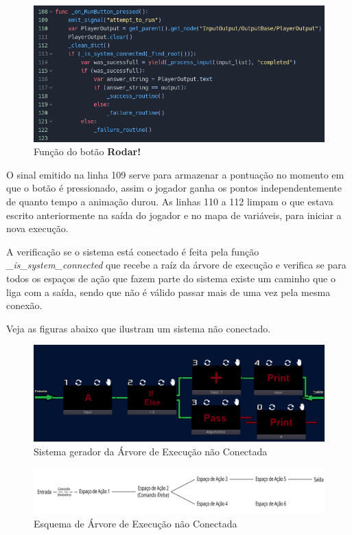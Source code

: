\begin{figure}[H]
    \includegraphics[width=\textwidth]{../figuras/funcao_RunButton_pressed.png}
    \caption{Função do botão \textbf{Rodar!}}
\end{figure}

O sinal emitido na linha 109 serve para armazenar a pontuação no momento em que
o botão é pressionado, assim o jogador ganha os pontos independentemente de 
quanto tempo a animação durou. As linhas 110 a 112 limpam o que estava escrito 
anteriormente na saída do jogador e no mapa de variáveis, para iniciar a nova 
execução.

A verificação se o sistema está conectado é feita pela função 
\textit{\_is\_system\_connected} que recebe a raíz da árvore de execução e
verifica se para todos os espaços de ação que fazem parte do sistema existe 
um caminho que o liga com a saída, sendo que não é válido passar mais de uma vez 
pela mesma conexão.

Veja as figuras abaixo que ilustram um sistema não conectado. 

\begin{figure}[H]
    \includegraphics[width=\textwidth]{../figuras/sistema_nao_conectado_arvore_execucao.png}
    \caption{Sistema gerador da Árvore de Execução não Conectada}
\end{figure}

\begin{figure}[H]
    \includegraphics[width=\textwidth]{../figuras/arvore_execucao_nao_conectada.png}
    \caption{Esquema de Árvore de Execução não Conectada}
\end{figure}

